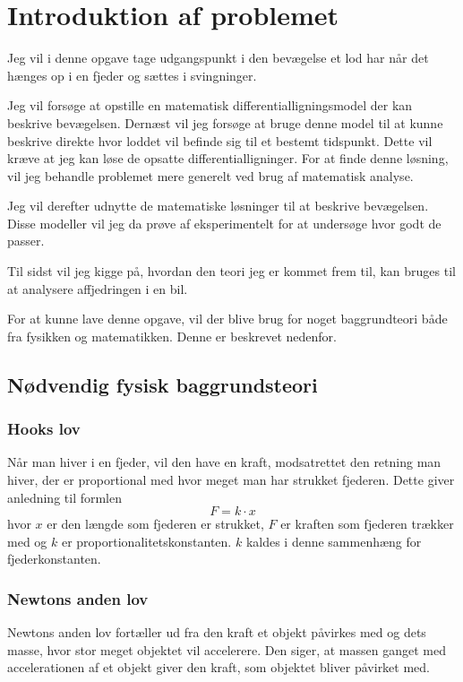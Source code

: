 \chapter{Introduktion af problemet}
Jeg vil i denne opgave tage udgangspunkt i den bevægelse et lod har når det hænges op i en fjeder og sættes i svingninger.

Jeg vil forsøge at opstille en matematisk differentialligningsmodel der kan beskrive bevægelsen.
Dernæst vil jeg forsøge at bruge denne model til at kunne beskrive direkte hvor loddet vil befinde sig til et bestemt tidspunkt. 
Dette vil kræve at jeg kan løse de opsatte differentialligninger. 
For at finde denne løsning, vil jeg behandle problemet mere generelt ved brug af matematisk analyse. 

Jeg vil derefter udnytte de matematiske løsninger til at beskrive bevægelsen.
Disse modeller vil jeg da prøve af eksperimentelt for at undersøge hvor godt de passer. 

Til sidst vil jeg kigge på, hvordan den teori jeg er kommet frem til, kan bruges til at analysere affjedringen i en bil. 
\vspace{1cm}

For at kunne lave denne opgave, vil der blive brug for noget baggrundteori både fra fysikken og matematikken. 
Denne er beskrevet nedenfor.

\section{Nødvendig fysisk baggrundsteori}
\subsection{Hooks lov}\label{teori:Hooks lov}
Når man hiver i en fjeder, vil den have en kraft, modsatrettet den retning man hiver, der er proportional med hvor meget man har strukket fjederen. 
Dette giver anledning til formlen 
$$F =k\cdot x$$
hvor $x$ er den længde som fjederen er strukket, $F$ er kraften som fjederen trækker med og $k$ er proportionalitetskonstanten. 
$k$ kaldes i denne sammenhæng for fjederkonstanten.

\subsection{Newtons anden lov}\label{teori:Newtons anden lov}
Newtons anden lov fortæller ud fra den kraft et objekt påvirkes med og dets masse, hvor stor meget objektet vil accelerere. 
Den siger, at massen ganget med accelerationen af et objekt giver den kraft, som objektet bliver påvirket med.

